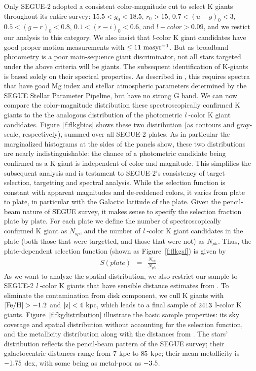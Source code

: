 \documentclass[12pt,preprint]{aastex}
\newcommand{\feh}{{\rm [Fe/H]}}
\begin{document}
Only SEGUE-2 adopted a consistent color-magnitude cut to select K giants throughout its entire survey: $15.5<g_0<18.5$, $r_0>15$, $0.7<(u-g)_0<3$, $0.5<(g-r)_0<0.8$, $0.1<(r-i)_0<0.6$, and $l-color>0.09$, and we restict our analysis to this category. We also insist that \textit{l}-color K giant candidates have good proper motion measurements with $\le \rm 11~masyr^{-1}$.
But as broadband photometry is a poor main-sequence giant discriminator, not all stars targeted under the above criteria will be giants. The subsequent identification of K-giants is based solely on their spectral properties. As described in \citet{Xue2014}, this requires spectra that have good Mg index and stellar atmospheric parameters determined by the SEGUE Stellar Parameter Pipeline\citep[SSPP;][]{Lee2008a,Lee2008b,Lee2011}, but have no strong G band.
We can now compare the color-magnitude distribution these spectroscopically confirmed K giants
to the the analogous distribution of the photometric \textit{l} -color K giant candidates.
Figure~\ref{f:flkgbias} shows these two distribution (as contours and gray-scale, respectively), summed over all SEGUE-2 plates. As in particular the marginalized histograms at the sides of the panels show, these two distributions are nearly indistinguishable: the chance of a photometric candidate being confirmed as a K-giant is independent of color and magnitude. This simplifies the subsequent analysis and is testament to SEGUE-2's consistency of target selection, targetting and spectral analysis.
While the selection function is constant with apparent magnitudes and de-reddened colors, it varies from plate to plate, in particular with the Galactic latitude of the plate. Given the pencil-beam nature of SEGUE survey, it makes sense to specify the selection fraction plate by plate.
For each plate we define the number of spectroscopically confirmed K giant as $N_{sp}$, and the number of \textit{l} -color K giant candidates in the plate (both those that were targetted, and those that were not) as $N_{ph}$. Thus, the plate-dependent selection function (shown as Figure~\ref{f:flkgsf}) is given by
\begin{eqnarray}
S(plate) &=& \frac{N_{sp}}{N_{ph}}
\end{eqnarray}
As we want to analyze the spatial distribution, we also restrict our sample to SEGUE-2
\textit{l} -color K giants that have sensible distance estimates from \citet{Xue2014}. To eliminate the contamination from disk
component, we cull K giants with $\rm \feh>-1.2$ and $\rm |z|<4~$kpc, which leads to a final sample of $\rm 2413$
l-color K giants. Figure~\ref{f:fkgdistribution} illustrate the basic sample properties: its sky coverage and spatial
distribution without accounting for the selection function, and the metallicity distribution along with the distances
from \citet{Xue2014}. The stars' distribution reflects the pencil-beam pattern of the SEGUE survey; their galactocentric
distances range from $\rm 7~$kpc to $\rm 85~$kpc; their mean metallicity is $\rm -1.75~$dex, with some being
as metal-poor as $\rm -3.5$.
\end{document}
